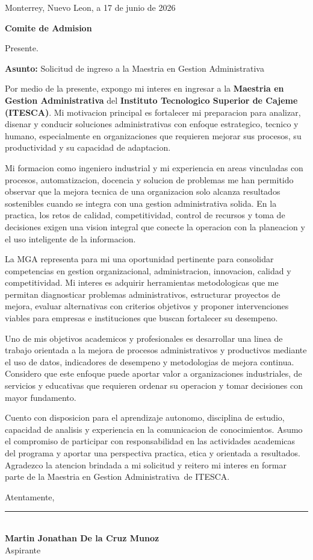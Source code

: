 \documentclass[11pt,letterpaper]{article}
\newcommand{\citydate}{Monterrey, Nuevo Leon, a 17 de junio de 2026}
\newcommand{\recipient}{Comite de Admision}
\newcommand{\programname}{Maestria en Gestion Administrativa}
\newcommand{\institutionname}{Instituto Tecnologico Superior de Cajeme (ITESCA)}
\newcommand{\subjectline}{Solicitud de ingreso a la Maestria en Gestion Administrativa}
\newcommand{\applicantname}{Martin Jonathan De la Cruz Munoz}
\begin{document}
\begin{flushright}
\citydate
\end{flushright}

\vspace{1.2em}
{\bfseries \recipient\par}
Presente.

\vspace{0.8em}
{\bfseries Asunto:} \subjectline

\vspace{0.8em}
\justifying
Por medio de la presente, expongo mi interes en ingresar a la \textbf{\programname} del \textbf{\institutionname}. Mi motivacion principal es fortalecer mi preparacion para analizar, disenar y conducir soluciones administrativas con enfoque estrategico, tecnico y humano, especialmente en organizaciones que requieren mejorar sus procesos, su productividad y su capacidad de adaptacion.

Mi formacion como ingeniero industrial y mi experiencia en areas vinculadas con procesos, automatizacion, docencia y solucion de problemas me han permitido observar que la mejora tecnica de una organizacion solo alcanza resultados sostenibles cuando se integra con una gestion administrativa solida. En la practica, los retos de calidad, competitividad, control de recursos y toma de decisiones exigen una vision integral que conecte la operacion con la planeacion y el uso inteligente de la informacion.

La MGA representa para mi una oportunidad pertinente para consolidar competencias en gestion organizacional, administracion, innovacion, calidad y competitividad. Mi interes es adquirir herramientas metodologicas que me permitan diagnosticar problemas administrativos, estructurar proyectos de mejora, evaluar alternativas con criterios objetivos y proponer intervenciones viables para empresas e instituciones que buscan fortalecer su desempeno.

Uno de mis objetivos academicos y profesionales es desarrollar una linea de trabajo orientada a la mejora de procesos administrativos y productivos mediante el uso de datos, indicadores de desempeno y metodologias de mejora continua. Considero que este enfoque puede aportar valor a organizaciones industriales, de servicios y educativas que requieren ordenar su operacion y tomar decisiones con mayor fundamento.

Cuento con disposicion para el aprendizaje autonomo, disciplina de estudio, capacidad de analisis y experiencia en la comunicacion de conocimientos. Asumo el compromiso de participar con responsabilidad en las actividades academicas del programa y aportar una perspectiva practica, etica y orientada a resultados. Agradezco la atencion brindada a mi solicitud y reitero mi interes en formar parte de la \programname\ de ITESCA.

\vspace{1.8em}
Atentamente,

\vspace{3.0em}
\rule{0.58\textwidth}{0.4pt}\\[-0.2em]
\textbf{\applicantname}\\
Aspirante
\end{document}

